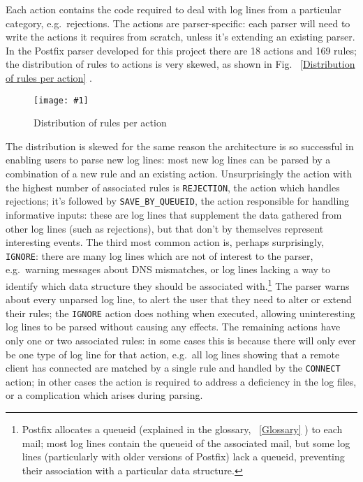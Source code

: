 \documentclass[draft]{svmult}
\newcommand{\showgraph}[3]{%
    \begin{figure}[hbt!]
        \caption{#2}\label{#3}
        \texttt{[image: \#1]}
    \end{figure}
}
\newcommand{\refwithpage}[1]{%
    \empty{}\vref{#1}%
}
\newcommand{\sectionref}[1]{%
    \textsection{}\vref*{#1}%
}
\newcommand{\numberOFrules}[0]{%
    169%
}
\newcommand{\numberOFactions}[0]{%
    18%
}
\begin{document}
Each action contains the code required to deal with log lines from a
particular category, e.g.\ rejections.  The actions are parser-specific:
each parser will need to write the actions it requires from scratch, unless
it's extending an existing parser.  In the Postfix parser developed for
this project there are \numberOFactions{} actions and \numberOFrules{}
rules; the distribution of rules to actions is very skewed, as shown in
Fig.~\refwithpage{Distribution of rules per action}.
\showgraph{build/plot-action-distribution}{Distribution of rules per
action}{Distribution of rules per action} The distribution is skewed for
the same reason the architecture is so successful in enabling users to
parse new log lines: most new log lines can be parsed by a combination of a
new rule and an existing action.  Unsurprisingly the action with the
highest number of associated rules is \texttt{REJECTION}, the action which
handles rejections; it's followed by \texttt{SAVE\_BY\_QUEUEID}, the action
responsible for handling informative inputs: these are log lines that
supplement the data gathered from other log lines (such as rejections), but
that don't by themselves represent interesting events.  The third most
common action is, perhaps surprisingly, \texttt{IGNORE}: there are many log
lines which are not of interest to the parser, e.g.\ warning messages about
DNS mismatches, or log lines lacking a way to identify which data structure
they should be associated with.\footnote{Postfix allocates a queueid
(explained in the glossary,~\sectionref{Glossary}) to each mail; most log
lines contain the queueid of the associated mail, but some log lines
(particularly with older versions of Postfix) lack a queueid, preventing
their association with a particular data structure.}  The parser warns
about every unparsed log line, to alert the user that they need to alter or
extend their rules; the \texttt{IGNORE} action does nothing when executed,
allowing uninteresting log lines to be parsed without causing any effects.
The remaining actions have only one or two associated rules: in some cases
this is because there will only ever be one type of log line for that
action, e.g.\ all log lines showing that a remote client has connected are
matched by a single rule and handled by the \texttt{CONNECT} action; in
other cases the action is required to address a deficiency in the log
files, or a complication which arises during parsing.
\end{document}
